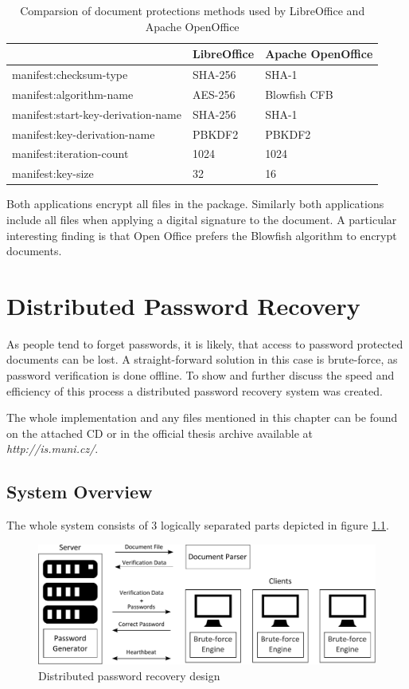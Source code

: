 \documentclass[11pt,oneside]{fithesis2}
\begin{document}
\begin{table}[h]
	\centering
	\begin{tabular}{|l|l|l|}
               \hline
		&\textbf{LibreOffice}&\textbf{Apache OpenOffice}\\
	\hline
		manifest:checksum-type&SHA-256&SHA-1\\
	\hline
		manifest:algorithm-name&AES-256&Blowfish CFB\\
	\hline
		manifest:start-key-derivation-name&SHA-256&SHA-1\\
		manifest:key-derivation-name&PBKDF2&PBKDF2\\
		manifest:iteration-count&1024&1024\\
		manifest:key-size&32&16\\
	\hline
           \end{tabular}
	\caption{Comparsion of document protections methods used by LibreOffice and Apache OpenOffice}
	\label{odt_impl_results}
\end{table}

Both applications encrypt all files in the package. Similarly both applications include all files when applying a digital signature to the document. A particular interesting finding is that Open Office prefers the Blowfish algorithm to encrypt documents.

\chapter{Distributed Password Recovery}

As people tend to forget passwords, it is likely, that access to password protected documents can be lost. A straight-forward solution in this case is brute-force, as password verification is done offline. To show and further discuss the speed and efficiency of this process a distributed password recovery system was created.

The whole implementation and any files mentioned in this chapter can be found on the attached CD or in the official thesis archive available at \textit{http://is.muni.cz/}.

\section{System Overview}

The whole system consists of 3 logically separated parts depicted in figure \ref{ddpbf_design}. 

\begin{figure}[ht]
	\centering
	\includegraphics[width=1\textwidth]{figures/ddpbf_design.pdf}
	\caption{Distributed password recovery design}
	\label{ddpbf_design}
\end{figure}
\end{document}
